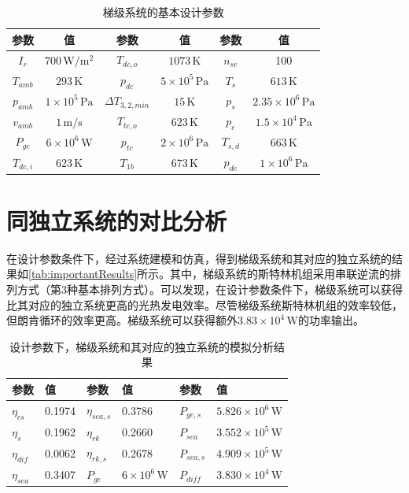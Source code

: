 \begin{table}[htbp]
\setlength{\abovecaptionskip}{0pt}
	\caption{梯级系统的基本设计参数}
	\centering
	\begin{tabular}{cccccc}
		\toprule
		参数		&	值	&	参数		&	值	&	参数		&	值\\
		\midrule
		$I_r$		&	$700\,\mathrm{W/m^2}$	&	$T_{dc,o}$	&	$1073\,\mathrm{K}$	&	$n_{se}$	&	100\\
		$T_{amb}$	&	$293\,\mathrm{K}$	&	$p_{dc}$		&	$5\times10^5\,\mathrm{Pa}$	&	$T_s$	&	$613\,\mathrm{K}$\\
		$p_{amb}$	&	$1\times10^5\,\mathrm{Pa}$	&	$\Delta{}T_{3,2,min}$	&	$15\,\mathrm{K}$	&	$p_s$	&	$2.35\times10^6\,\mathrm{Pa}$\\
		$v_{amb}$	&	$1\,\mathrm{m/s}$	&	$T_{tc,o}$	&	$623\,\mathrm{K}$	&	$p_c$	&	$1.5\times10^4\,\mathrm{Pa}$\\
		$P_{ge}$	&	$6\times10^6\,\mathrm{W}$	&	
$p_{tc}$	&	$2\times10^6\,\mathrm{Pa}$	&	$T_{s,d}$	&	$663\,\mathrm{K}$\\
		$T_{dc,i}$		&	$623\,\mathrm{K}$	&	$T_{1b}$	&	$673\,\mathrm{K}$	&	$p_{de}$ 	& 	$1\times10^6\,\mathrm{Pa}$\\
	\bottomrule
	\end{tabular}
	\label{tab:CascadeSystemParameters}
\end{table}

\section{同独立系统的对比分析}

在设计参数条件下，经过系统建模和仿真，得到梯级系统和其对应的独立系统的结果如\autoref{tab:importantResults}所示。其中，梯级系统的斯特林机组采用串联逆流的排列方式（第3种基本排列方式）。可以发现，在设计参数条件下，梯级系统可以获得比其对应的独立系统更高的光热发电效率。尽管梯级系统斯特林机组的效率较低，但朗肯循环的效率更高。梯级系统可以获得额外$3.83\times10^4\,\mathrm{W}$的功率输出。

\begin{table}[htbp]
\setlength{\abovecaptionskip}{0pt}
	\caption{设计参数下，梯级系统和其对应的独立系统的模拟分析结果}
	\centering
	\begin{tabular}{p{1cm}<{\centering} p{1.75cm}<{\centering} p{1cm}<{\centering} p{1.75cm}<{\centering} p{1cm}<{\centering} p{3cm}<{\centering}}
		\toprule
		参数		&	值	&	参数		&	值	&	参数		&	值\\
		\midrule
		$\eta_{cs}$		&	0.1974	&	$\eta_{sea,s}$	&	0.3786	&	$P_{ge,s}$	&	$5.826\times10^6\,\mathrm{W}$\\
		$\eta_{s}$	&	0.1962	&	$\eta_{rk}$	&	0.2660	&	$P_{sea}$		&	$3.552\times10^5\,\mathrm{W}$\\
		$\eta_{dif}$		&	0.0062	&	$\eta_{rk,s}$	&	0.2678	&	$P_{sea,s}$	&	$4.909\times10^5\,\mathrm{W}$\\
		$\eta_{sea}$	&	0.3407	&	$P_{ge}$		&	$6\times10^6\,\mathrm{W}$	&	$P_{diff}$		&	$3.830\times10^4\,\mathrm{W}$\\
		\bottomrule
	\end{tabular}
	\label{tab:importantResults}
\end{table}


